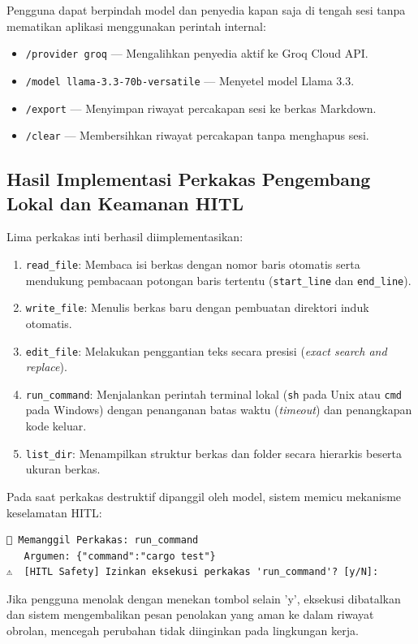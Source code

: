 Pengguna dapat berpindah model dan penyedia kapan saja di tengah sesi tanpa mematikan aplikasi menggunakan perintah internal:
\begin{itemize}[noitemsep]
    \item \texttt{/provider groq} — Mengalihkan penyedia aktif ke Groq Cloud API.
    \item \texttt{/model llama-3.3-70b-versatile} — Menyetel model Llama 3.3.
    \item \texttt{/export} — Menyimpan riwayat percakapan sesi ke berkas Markdown.
    \item \texttt{/clear} — Membersihkan riwayat percakapan tanpa menghapus sesi.
\end{itemize}

\subsection{Hasil Implementasi Perkakas Pengembang Lokal dan Keamanan HITL}
Lima perkakas inti berhasil diimplementasikan:
\begin{enumerate}
    \item \texttt{read\_file}: Membaca isi berkas dengan nomor baris otomatis serta mendukung pembacaan potongan baris tertentu (\texttt{start\_line} dan \texttt{end\_line}).
    \item \texttt{write\_file}: Menulis berkas baru dengan pembuatan direktori induk otomatis.
    \item \texttt{edit\_file}: Melakukan penggantian teks secara presisi (\textit{exact search and replace}).
    \item \texttt{run\_command}: Menjalankan perintah terminal lokal (\texttt{sh} pada Unix atau \texttt{cmd} pada Windows) dengan penanganan batas waktu (\textit{timeout}) dan penangkapan kode keluar.
    \item \texttt{list\_dir}: Menampilkan struktur berkas dan folder secara hierarkis beserta ukuran berkas.
\end{enumerate}

Pada saat perkakas destruktif dipanggil oleh model, sistem memicu mekanisme keselamatan HITL:
\begin{verbatim}
🔧 Memanggil Perkakas: run_command
   Argumen: {"command":"cargo test"}
⚠️  [HITL Safety] Izinkan eksekusi perkakas 'run_command'? [y/N]: 
\end{verbatim}
Jika pengguna menolak dengan menekan tombol selain 'y', eksekusi dibatalkan dan sistem mengembalikan pesan penolakan yang aman ke dalam riwayat obrolan, mencegah perubahan tidak diinginkan pada lingkungan kerja.

